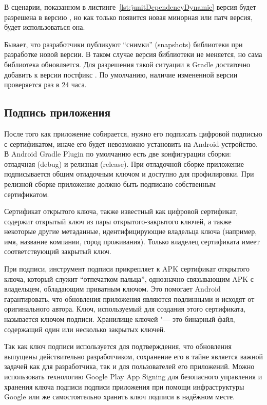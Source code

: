 В сценарии, показанном в листинге~\ref{lst:junitDependencyDynamic} версия  будет разрешена в версию , но как только появится новая минорная или патч версия, будет использоваться она.

Бывает, что разработчики публикуют ``снимки'' (snapshots) библиотеки при разработке новой версии.
В таком случае версия библиотеки не меняется, но сама библиотека обновляется.
Для разрешения такой ситуации в Gradle достаточно добавить к версии постфикс .
По умолчанию, наличие измененной версии проверяется раз в 24 часа.

\subsection{Подпись приложения}
\label{subsec:signing}

После того как приложение собирается, нужно его подписать цифровой подписью с сертификатом, иначе его будет невозможно установить на Android-устройство.
В Android Gradle Plugin по умолчанию есть две конфигурации сборки: отладчная (debug) и релизная (release).
При отладочной сборке приложение подписывается общим отладочным ключом и доступно для профилировки.
При релизной сборке приложение должно быть подписано собственным сертификатом.

Сертификат открытого ключа, также известный как цифровой сертификат, содержит открытый ключ из пары открытого-закрытого ключей, а также некоторые другие метаданные, идентифицирующие владельца ключа (например, имя, название компании, город проживания).
Только владелец сертификата имеет соответствующий закрытый ключ.

При подписи, инструмент подписи прикрепляет к APK сертификат открытого ключа, который служит ``отпечатком пальца'', однозначно связывающим APK с владельцем, обладающим приватным ключом.
Это помогает Android гарантировать, что обновления приложения являются подлинными и исходят от оригинального автора.
Ключ, используемый для создания этого сертификата, называется ключом подписи.
Хранилище ключей "--- это бинарный файл, содержащий один или несколько закрытых ключей.

Так как ключ подписи используется для подтверждения, что обновления выпущены действительно разработчиком, сохранение его в тайне является важной задачей как для разработчика, так и для пользователей его приложений.
Можно использовать технологию Google Play App Signing для безопасного управления и хранения ключа подписи подписи приложения при помощи инфраструктуры Google или же самостоятельно хранить ключ подписи в надёжном месте.

